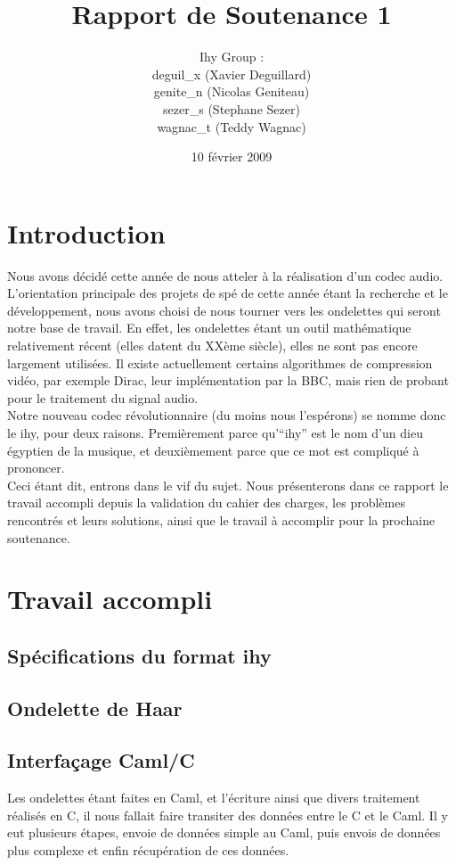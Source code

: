 \documentclass[a4paper,12pt]{article}
\title{Rapport de Soutenance 1}
\author{
Ihy Group : \\
deguil\_x (Xavier Deguillard)\\
genite\_n (Nicolas Geniteau)\\
sezer\_s (Stephane Sezer)\\
wagnac\_t (Teddy Wagnac)
}
\date{10 f\'evrier 2009}
\begin{document}
\maketitle

\newpage

\section*{Introduction}
Nous avons  décidé cette  année de  nous atteler  à la  réalisation d'un
codec audio.  L'orientation principale des projets de spé de cette année
étant  la recherche  et le  développement,  nous  avons  choisi  de nous
tourner vers les ondelettes qui seront notre base de travail.  En effet,
les ondelettes  étant un outil  mathématique relativement  récent (elles
datent du XXème siècle),  elles ne  sont pas encore largement utilisées.
Il existe  actuellement certains algorithmes  de compression vidéo,  par
exemple Dirac, leur implémentation par la BBC, mais rien de probant pour
le traitement du signal audio.\\
Notre nouveau codec révolutionnaire (du  moins nous l'espérons) se nomme
donc le  ihy,  pour deux raisons.  Premièrement parce  qu'``ihy'' est le
nom d'un dieu égyptien de la  musique,  et deuxièmement parce que ce mot
est compliqué à prononcer.\\
Ceci étant dit, entrons dans le vif du sujet.  Nous présenterons dans ce
rapport le travail accompli depuis  la validation du cahier des charges,
les problèmes  rencontrés et  leurs solutions,  ainsi  que le  travail à
accomplir pour la prochaine soutenance.

\newpage

\tableofcontents

\newpage

\section{Travail accompli}

	\subsection{Spécifications du format ihy}

	\subsection{Ondelette de Haar}

	\subsection{Interfaçage Caml/C}
Les ondelettes  étant faites  en Caml,  et  l'écriture ainsi  que divers
traitement réalisés en  C,  il nous fallait faire  transiter des données
entre le  C et le Caml.  Il  y eut plusieurs  étapes,  envoie de données
simple  au  Caml,   puis  envois  de  données  plus  complexe  et  enfin
récupération de ces données.\\
\end{document}
